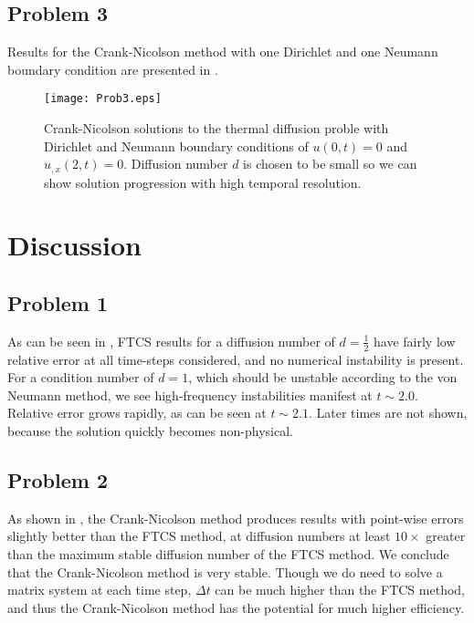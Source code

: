 \documentclass[11pt]{article}
\begin{document}
\subsection{Problem 3}

Results for the Crank-Nicolson method with one Dirichlet and one Neumann boundary condition are presented in .

\begin{figure}[h!]
\begin{center}
\texttt{[image: Prob3.eps]}
\\[-0.5cm]
\caption{Crank-Nicolson solutions to the thermal diffusion proble with Dirichlet and Neumann boundary conditions of $u(0,t) = 0$ and $u_{,x}(2,t) = 0$. Diffusion number $d$ is chosen to be small so we can show solution progression with high temporal resolution.}
\label{fig:Prob3}
\end{center}
\end{figure}

\section{Discussion} %

\subsection{Problem 1}

As can be seen in , FTCS results for a diffusion number of $d=\tfrac{1}{2}$ have fairly low relative error at all time-steps considered, and no numerical instability is present. For a condition number of $d=1$, which should be unstable according to the von Neumann method, we see high-frequency instabilities manifest at $t \sim 2.0$. Relative error grows rapidly, as can be seen at $t \sim 2.1$. Later times are not shown, because the solution quickly becomes non-physical.

\subsection{Problem 2}

As shown in , the Crank-Nicolson method produces results with point-wise errors slightly better than the FTCS method, at diffusion numbers at least $10\times$ greater than the maximum stable diffusion number of the FTCS method. We conclude that the Crank-Nicolson method is very stable. Though we do need to solve a matrix system at each time step, $\Delta t$ can be much higher than the FTCS method, and thus the Crank-Nicolson method has the potential for much higher efficiency.
\end{document}
